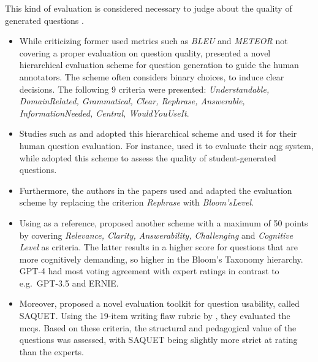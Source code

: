 
 This kind of evaluation is considered necessary to judge about the quality of generated questions \cite{horbach_linguistic_2020}.

\begin{itemize}
   \item While criticizing former used metrics such as \textit{BLEU} and \textit{METEOR} not covering a proper evaluation on question quality, \cite{horbach_linguistic_2020} presented a novel hierarchical evaluation scheme for question generation to guide the human annotators. The scheme often considers binary choices, to induce clear decisions. The following 9 criteria were presented: \textit{Understandable, DomainRelated, Grammatical, Clear, Rephrase, Answerable, InformationNeeded, Central, WouldYouUseIt}. 
   \item Studies such as \cite{steuer_i_2021} and \cite{moore_assessing_2022} adopted this hierarchical scheme and used it for their human question evaluation. For instance, \cite{steuer_i_2021} used it to evaluate their \ac{aqg} system, while \cite{moore_assessing_2022} adopted this scheme to assess the quality of student-generated questions.
   \item Furthermore, the authors in the papers \cite{scaria_how_2024,scaria_automated_2024} used and adapted the evaluation scheme by replacing the criterion \textit{Rephrase} with \textit{Bloom'sLevel}.
   \item  Using \cite{moore_assessing_2022} as a reference, \cite{mi_comparative_2024} proposed another scheme with a maximum of 50 points by covering \textit{Relevance, Clarity, Answerability, Challenging} and \textit{Cognitive Level} as criteria. The latter results in a higher score for questions that are more cognitively demanding, so higher in the Bloom's Taxonomy hierarchy. GPT-4 had most voting agreement with expert ratings in contrast to e.g.\ GPT-3.5 and ERNIE.
   \item Moreover, \cite{moore_automatic_2024} proposed a novel evaluation toolkit for question usability, called SAQUET. Using the 19-item writing flaw rubric by \cite{tarrant_frequency_2006}, they evaluated the \ac{mcqs}. Based on these criteria, the structural and pedagogical value of the questions was assessed, with SAQUET being slightly more strict at rating than the experts.
\end{itemize}


